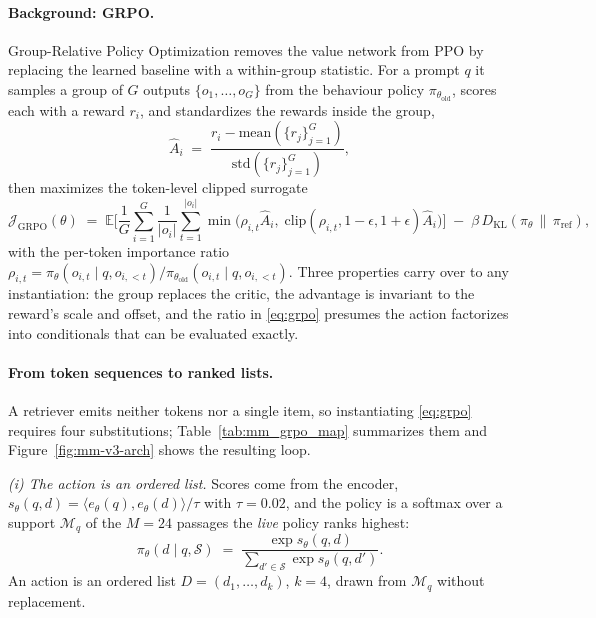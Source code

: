 \paragraph{Background: GRPO.} Group-Relative Policy Optimization removes the value network from
PPO by replacing the learned baseline with a within-group statistic. For a prompt $q$ it samples a
group of $G$ outputs $\{o_1,\dots,o_G\}$ from the behaviour policy $\pi_{\theta_{\mathrm{old}}}$,
scores each with a reward $r_i$, and standardizes the rewards inside the group,
\begin{equation}
\hat{A}_i \;=\; \frac{r_i - \mathrm{mean}(\{r_j\}_{j=1}^{G})}{\mathrm{std}(\{r_j\}_{j=1}^{G})},
\label{eq:grpo_adv}
\end{equation}
then maximizes the token-level clipped surrogate
\begin{equation}
\mathcal{J}_{\mathrm{GRPO}}(\theta) \;=\;
\mathbb{E}\Big[\frac{1}{G}\sum_{i=1}^{G}\frac{1}{|o_i|}\sum_{t=1}^{|o_i|}
\min\big(\rho_{i,t}\hat{A}_i,\;
\mathrm{clip}(\rho_{i,t},1-\epsilon,1+\epsilon)\hat{A}_i\big)\Big]
\;-\;\beta\, D_{\mathrm{KL}}\!\left(\pi_\theta \,\|\, \pi_{\mathrm{ref}}\right),
\label{eq:grpo}
\end{equation}
with the per-token importance ratio
$\rho_{i,t} = \pi_\theta(o_{i,t}\mid q,o_{i,<t}) / \pi_{\theta_{\mathrm{old}}}(o_{i,t}\mid q,o_{i,<t})$.
Three properties carry over to any instantiation: the group replaces the critic, the advantage is
invariant to the reward's scale and offset, and the ratio in \eqref{eq:grpo} presumes the action
factorizes into conditionals that can be evaluated exactly.

\paragraph{From token sequences to ranked lists.} A retriever emits neither tokens nor a single
item, so instantiating \eqref{eq:grpo} requires four substitutions; Table~\ref{tab:mm_grpo_map}
summarizes them and Figure~\ref{fig:mm-v3-arch} shows the resulting loop.

\emph{(i) The action is an ordered list.} Scores come from the encoder,
$s_\theta(q,d) = \langle e_\theta(q), e_\theta(d)\rangle/\tau$ with $\tau{=}0.02$, and the policy
is a softmax over a support $\mathcal{M}_q$ of the $M{=}24$ passages the \emph{live} policy ranks
highest:
\begin{equation}
\pi_\theta(d \mid q, \mathcal{S}) \;=\;
\frac{\exp s_\theta(q,d)}{\sum_{d' \in \mathcal{S}} \exp s_\theta(q,d')} .
\label{eq:item_policy}
\end{equation}
An action is an ordered list $D=(d_1,\dots,d_k)$, $k{=}4$, drawn from $\mathcal{M}_q$ without
replacement.

